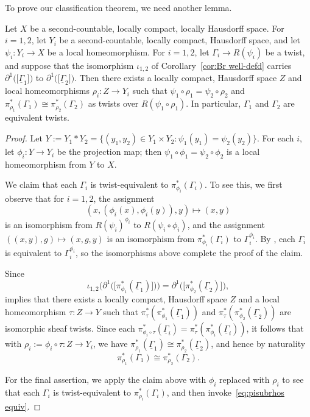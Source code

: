 \documentclass[12pt,a4paper]{amsart}
\begin{document}
To prove our classification theorem, we need another lemma.

\begin{lemma}\label{lem:DD->equivalent twists}
Let $X$ be a second-countable, locally compact, locally
Hausdorff space. For $i =1,2$, let $Y_i$ be a second-countable,
locally compact, Hausdorff space, and let $\psi_i : Y_i \to X$
be a local homeomorphism. For $i = 1,2$, let $\Gamma_i \to
R(\psi_i)$ be a twist, and suppose that the isomorphism
$\iota_{1,2}$ of Corollary~\ref{cor:Br well-defd} carries
$\partial^1\big(\!\big[\underline{\Gamma}_1\big]\!\big)$ to
$\partial^1\big(\!\big[\underline{\Gamma}_2\big]\!\big)$. Then
there exists a locally compact, Hausdorff space $Z$ and local
homeomorphisms $\rho_i : Z \to Y_i$ such that $\psi_1 \circ
\rho_1 = \psi_2 \circ \rho_2$ and $\pi_{\rho_1}^*(\Gamma_1)
\cong \pi_{\rho_2}^*(\Gamma_2)$ as twists over $R(\psi_1 \circ
\rho_1)$. In particular, $\Gamma_1$ and $\Gamma_2$ are
equivalent twists.
\end{lemma}
\begin{proof}
Let $Y := Y_1 \ast Y_2 = \{(y_1, y_2) \in Y_1 \times Y_2 :
\psi_1(y_1) = \psi_2(y_2)\}$. For each $i$, let $\phi_i : Y \to
Y_i$ be the projection map; then $\psi_1 \circ \phi_1 = \psi_2
\circ\phi_2$ is a local homeomorphism from $Y$ to $X$.

We claim that each $\Gamma_i$ is twist-equivalent to
$\pi^*_{\phi_i}(\Gamma_i)$. To see this, we first observe that
for $i = 1,2$, the assignment
\[
(x, (\phi_i(x), \phi_i(y)), y) \mapsto (x,y)
\]
is an isomorphism from $R(\psi_i)^{\phi_i}$ to $R(\psi_i \circ
\phi_i)$, and the assignment $((x,y),g) \mapsto (x,g,y)$ is an
isomorphism from $\pi_{\phi_i}^*(\Gamma_i)$ to
$\Gamma_i^{\phi_i}$. By \cite[Proposition~5.7]{Kumjian1986},
each $\Gamma_i$ is equivalent to $\Gamma_i^{\phi_i}$, so the
isomorphisms above complete the proof of the claim.

Since
\[
\iota_{1,2}\big(\partial^1\big(\!\big[\pi_{\phi_1}^*(\underline{\Gamma}_1)\big]\!\big)\big)
    = \partial^1\big(\!\big[\pi_{\phi_2}^*(\underline{\Gamma}_2)\big]\!\big),
\]
\cite[Proposition~3.9]{Kumjian1988} implies that there exists a
locally compact, Hausdorff space $Z$ and a local homeomorphism
$\tau : Z \to Y$ such that
$\pi_\tau^*(\pi_{\phi_1}^*(\underline{\Gamma}_1))$ and
$\pi_\tau^*(\pi_{\phi_2}^*(\underline{\Gamma}_2))$ are
isomorphic sheaf twists. Since each $\pi^*_{\phi_i \circ
\tau}(\underline{\Gamma}_i) =
\pi_\tau^*(\pi_{\phi_i}^*(\underline{\Gamma}_i))$, it follows
that with $\rho_i := \phi_i \circ \tau :  Z \to Y_i$, we have
$\pi^*_{\rho_1}(\underline{\Gamma}_1) \cong
\pi^*_{\rho_2}(\underline{\Gamma}_2)$, and hence by naturality
\begin{equation}\label{eq:pisubrhos equiv}
\pi^*_{\rho_1}(\Gamma_1) \cong \pi^*_{\rho_2}(\Gamma_2).
\end{equation}

For the final assertion, we apply the claim above with $\phi_i$
replaced with $\rho_i$ to see that each $\Gamma_i$ is
twist-equivalent to $\pi^*_{\rho_i}(\Gamma_i)$, and then
invoke~\eqref{eq:pisubrhos equiv}.
\end{proof}
\end{document}
